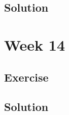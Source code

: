 \documentclass[
]{book}
\begin{document}
\hypertarget{solution-12}{%
\section{Solution}\label{solution-12}}

\hypertarget{week-14}{%
\chapter{Week 14}\label{week-14}}

\hypertarget{exercise-12}{%
\section{Exercise}\label{exercise-12}}

\hypertarget{solution-13}{%
\section{Solution}\label{solution-13}}

  
\end{document}
